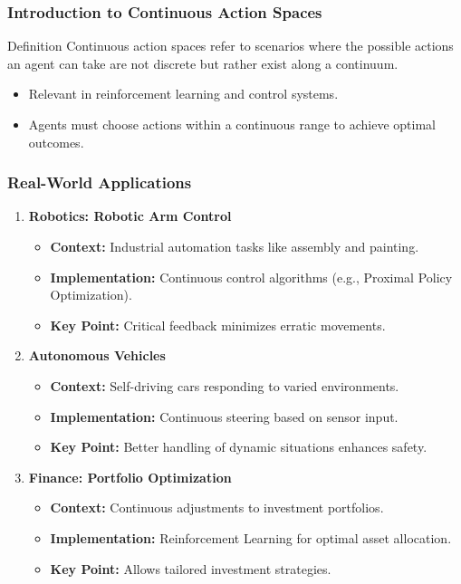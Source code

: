 \documentclass[aspectratio=169]{beamer}
\begin{document}
\begin{frame}[fragile]
    \frametitle{Introduction to Continuous Action Spaces}
    \begin{block}{Definition}
        Continuous action spaces refer to scenarios where the possible actions an agent can take are not discrete but rather exist along a continuum. 
    \end{block}
    \begin{itemize}
        \item Relevant in reinforcement learning and control systems.
        \item Agents must choose actions within a continuous range to achieve optimal outcomes.
    \end{itemize}
\end{frame}

\begin{frame}[fragile]
    \frametitle{Real-World Applications}
    \begin{enumerate}
        \item \textbf{Robotics: Robotic Arm Control}
        \begin{itemize}
            \item \textbf{Context:} Industrial automation tasks like assembly and painting.
            \item \textbf{Implementation:} Continuous control algorithms (e.g., Proximal Policy Optimization).
            \item \textbf{Key Point:} Critical feedback minimizes erratic movements.
        \end{itemize}

        \item \textbf{Autonomous Vehicles}
        \begin{itemize}
            \item \textbf{Context:} Self-driving cars responding to varied environments.
            \item \textbf{Implementation:} Continuous steering based on sensor input.
            \item \textbf{Key Point:} Better handling of dynamic situations enhances safety.
        \end{itemize}

        \item \textbf{Finance: Portfolio Optimization}
        \begin{itemize}
            \item \textbf{Context:} Continuous adjustments to investment portfolios.
            \item \textbf{Implementation:} Reinforcement Learning for optimal asset allocation.
            \item \textbf{Key Point:} Allows tailored investment strategies.
        \end{itemize}
    \end{enumerate}
\end{frame}
\end{document}
